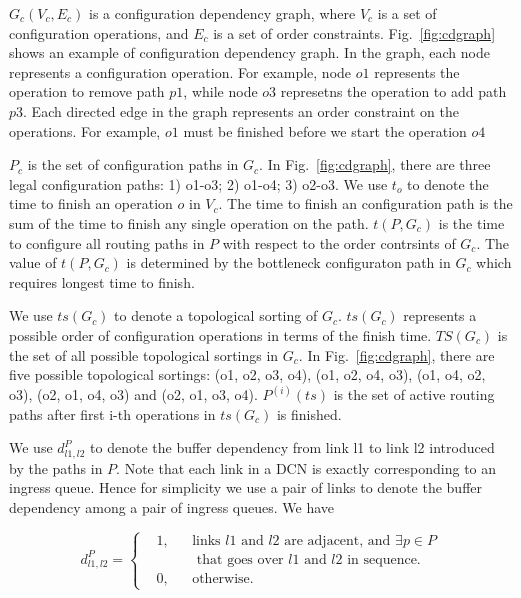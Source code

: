 
$G_c(V_c,E_c)$ is a configuration dependency graph, where $V_c$ is a set of configuration operations, and $E_c$ is a set of order constraints. Fig.~\ref{fig:cdgraph} shows an example of configuration dependency graph. In the graph, each node represents a configuration operation. For example, node $o1$ represents the operation to remove path $p1$, while node $o3$ represetns the operation to add path $p3$. Each directed edge in the graph represents an order constraint on the operations. For example,  $o1$ must be finished before we start the operation $o4$

$P_c$ is the set of configuration paths in $G_c$. In Fig.~\ref{fig:cdgraph}, there are three legal configuration paths: 1) o1-o3; 2) o1-o4; 3) o2-o3. 
We use $t_o$ to denote the time to finish an operation $o$ in  $V_c$.  The time to finish an configuration path is the sum of the time to finish any single operation on the path. $t(P, G_c)$ is the time to configure all routing paths in $P$ with respect to the order contrsints of $G_c$. The value of $t(P, G_c)$ is determined by the bottleneck configuraton path in $G_c$ which requires longest time to finish.

We use $ts(G_c)$ to denote a topological sorting of $G_c$. $ts(G_c)$ represents a possible order of configuration operations in terms of the finish time.  $TS(G_c)$ is the set of all possible topological sortings in $G_c$. In Fig.~\ref{fig:cdgraph}, there are five possible topological sortings: (o1, o2, o3, o4), (o1, o2, o4, o3), (o1, o4, o2, o3), (o2, o1, o4, o3) and (o2, o1, o3, o4). $P^{(i)}(ts)$ is  the set of active routing paths after first i-th operations in $ts(G_c)$ is finished. 

We use $d_{l1,l2}^P$ to denote the buffer dependency from link l1 to link l2 introduced by the paths in $P$. Note that each link in a DCN is exactly corresponding to an ingress queue. Hence for simplicity we use a pair of links to denote the buffer dependency among a pair of ingress queues.  We have

\begin{equation} \label{eq:1}
d_{l1,l2}^P = \left \{
\begin{aligned}
&1, && \text{links } l1 \text{ and } l2\text{ are adjacent, and } \exists p \in P\\
&    &&  \text{ that goes over } l1 \text{ and } l2\text{ in sequence.}\\ 
&0, && \text{otherwise.}
\end{aligned} \right.
\end{equation} 


